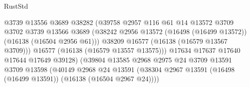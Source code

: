 \begin{lexlean}{RustStd}
\begin{coremodule}
                                            @3739
                                            @13556
                                            @3689
                                            @38282
                                            (@39758
                                              @2957
                                              @116
                                              @61
                                              @14
                                              @13572
                                              @3709
                                              @3702
                                              @3739
                                              @13566
                                              @3689
                                              (@38242
                                                @2956
                                                @13572
                                                (@16498 (@16499 @13572))
                                                (@16138 (@16504 @2956 @61)))
                                              @38209
                                              @16577
                                              (@16138 (@16579 @13567 @3709)))
                                            @16577
                                            (@16138 (@16579 @13557 @13575)))
                                          @17634
                                          @17637
                                          @17640
                                          @17644
                                          @17649
                                          @39128)
                                        (@39804
                                          @13585
                                          @2968
                                          @2975
                                          @24
                                          @3709
                                          @13591
                                          @3709
                                          @13598
                                          (@40149
                                            @2968
                                            @24
                                            @13591
                                            (@38304
                                              @2967
                                              @13591
                                              (@16498 (@16499 @13591))
                                              (@16138 (@16504 @2967 @24))))

\end{coremodule}
\end{lexlean}
